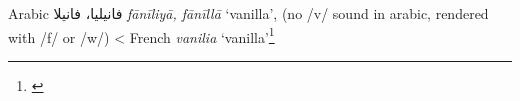 \begin{etymology}\label{ety:faniliya}
Arabic {فانيليا، فانيلا} \textit{fānīliyā, fānīllā} `vanilla', (no /v/ sound in arabic, rendered with /f/ or /w/)
< French \textit{vanilia} `vanilla'\footnote{\textcite[814]{baalbaki_-mawrid_1995}}
\end{etymology}
